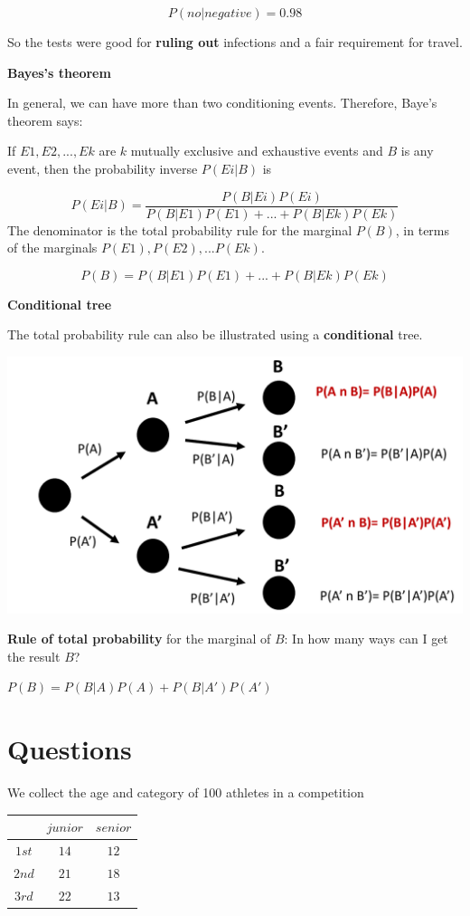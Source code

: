 \documentclass[
]{book}
\begin{document}
\[P(no| negative)= 0.98\]

So the tests were good for \textbf{ruling out} infections and a fair requirement for travel.

\textbf{Bayes's theorem}

In general, we can have more than two conditioning events. Therefore, Baye's theorem says:

If \(E1, E2, ..., Ek\) are \(k\) mutually exclusive and exhaustive events and \(B\) is any event, then the probability inverse \(P(Ei| B)\) is

\[P(Ei| B)= \frac{P(B|Ei)P(Ei)}{P(B|E1)P(E1) +...+ P(B|Ek)P(Ek)}\]
The denominator is the total probability rule for the marginal \(P(B)\), in terms of the marginals \(P(E1), P(E2), ... P(Ek)\).

\[P(B)=P(B|E 1)P (E1) +...+ P(B|Ek)P(Ek)\]

\textbf{Conditional tree}

The total probability rule can also be illustrated using a \textbf{conditional} tree.

\includegraphics{./figures/treetot.PNG}

\textbf{Rule of total probability} for the marginal of \(B\): In how many ways can I get the result \(B\)?

\(P(B)=P(B|A)P(A)+P(B|A')P(A')\)

\hypertarget{questions-2}{%
\section{Questions}\label{questions-2}}

We collect the age and category of 100 athletes in a competition

\begin{longtable}[]{@{}ccc@{}}
\toprule\noalign{}
& \(junior\) & \(senior\) \\
\midrule\noalign{}
\endhead
\bottomrule\noalign{}
\endlastfoot
\(1st\) & \(14\) & \(12\) \\
\(2nd\) & \(21\) & \(18\) \\
\(3rd\) & \(22\) & \(13\) \\
\end{longtable}
\end{document}
